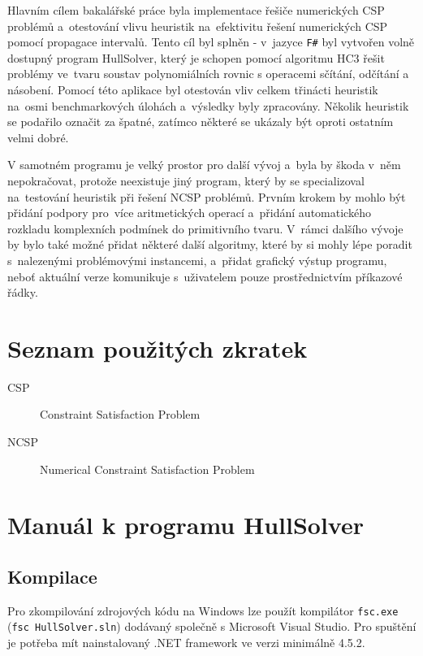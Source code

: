 \documentclass[thesis=B,czech]{FITthesis}[2012/06/26]
\theoremstyle{definition}
\begin{document}
\begin{conclusion}
Hlavním cílem bakalářské práce byla implementace řešiče numerických CSP problémů a~otestování vlivu heuristik na~efektivitu řešení numerických CSP pomocí propagace intervalů. Tento cíl byl splněn - v~jazyce \texttt{F\#} byl vytvořen volně dostupný program HullSolver, který je schopen pomocí algoritmu HC3 řešit problémy ve~tvaru soustav polynomiálních rovnic s operacemi sčítání, odčítání a násobení. Pomocí této aplikace byl otestován vliv celkem třinácti heuristik na~osmi benchmarkových úlohách a~výsledky byly zpracovány. Několik heuristik se podařilo označit za špatné, zatímco některé se ukázaly být oproti ostatním velmi dobré.

V samotném programu je velký prostor pro další vývoj a~byla by škoda v~něm nepokračovat, protože neexistuje jiný program, který by se specializoval na~testování heuristik při řešení NCSP problémů. Prvním krokem by mohlo být přidání podpory pro~více aritmetických operací a~přidání automatického rozkladu komplexních podmínek do primitivního tvaru. V~rámci dalšího vývoje by bylo také možné přidat některé další algoritmy, které by si mohly lépe poradit s~nalezenými problémovými instancemi, a~přidat grafický výstup programu, neboť aktuální verze komunikuje s~uživatelem pouze prostřednictvím příkazové řádky.




\end{conclusion}




\appendix

\chapter{Seznam použitých zkratek}
\begin{description}
	\item[CSP] Constraint Satisfaction Problem
	\item[NCSP] Numerical Constraint Satisfaction Problem
\end{description}



\chapter{Manuál k programu HullSolver}
\label{hullSolverManual}
\section{Kompilace}
Pro zkompilování zdrojových kódu na Windows lze použít kompilátor \verb|fsc.exe| (\verb|fsc HullSolver.sln|) dodávaný společně s Microsoft Visual Studio. Pro spuštění je potřeba mít nainstalovaný .NET framework ve verzi minimálně 4.5.2.
\end{document}
